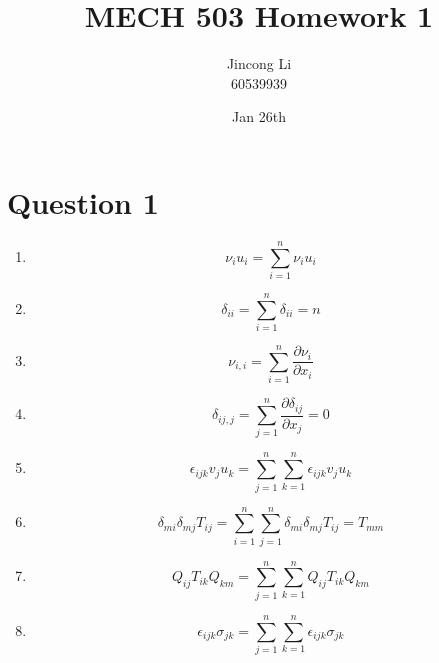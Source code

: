 \documentclass[a4paper,12pt]{article} %
\begin{document}
\newcommand{\vect}[1]{\mathbf{#1}}

\title{MECH 503 Homework 1}
\author{Jincong Li \\ 60539939}
\date{Jan 26th}
\maketitle

\section{\textbf{Question 1}}

\begin{enumerate}[label=(\alph*)]
    \item \[ \nu_i u_i = \sum_{i=1}^{n} \nu_i u_i \]

    \item \[ \delta_{ii} = \sum_{i=1}^{n} \delta_{ii} = n \]

    \item \[ \nu_{i,i} = \sum_{i=1}^{n} \frac{\partial \nu_i}{\partial x_i} \]

    \item \[ \delta_{ij,j} = \sum_{j=1}^{n} \frac{\partial \delta_{ij}}{\partial x_j} = 0 \]

    \item \[ \epsilon_{ijk} v_j u_k = \sum_{j=1}^{n} \sum_{k=1}^{n} \epsilon_{ijk} v_j u_k \]

    \item \[ \delta_{mi} \delta_{mj} T_{ij} = \sum_{i=1}^{n} \sum_{j=1}^{n} \delta_{mi} \delta_{mj} T_{ij} = T_{mm} \]

    \item \[ Q_{ij} T_{ik} Q_{km} = \sum_{j=1}^{n} \sum_{k=1}^{n} Q_{ij} T_{ik} Q_{km} \]

    \item \[ \epsilon_{ijk} \sigma_{jk} = \sum_{j=1}^{n} \sum_{k=1}^{n} \epsilon_{ijk} \sigma_{jk} \]
\end{enumerate}
\end{document}
